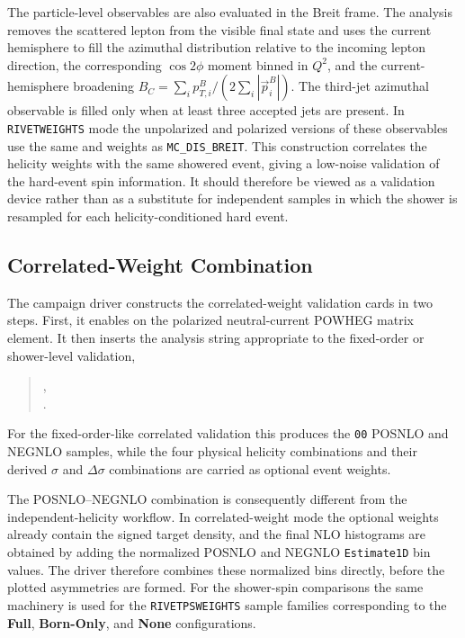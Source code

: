 \documentclass[a4paper,11pt]{article}
\begin{document}
The particle-level observables are also evaluated in the Breit frame. The
analysis removes the scattered lepton from the visible final state and uses the
current hemisphere to fill the azimuthal distribution relative to the incoming
lepton direction, the corresponding $\cos 2\phi$ moment binned in $Q^2$, and
the current-hemisphere broadening
$B_C=\sum_i p_{T,i}^B/(2\sum_i |\vec{p}_i^B|)$. The third-jet azimuthal
observable is filled only when at least three accepted jets are present. In
\texttt{RIVETWEIGHTS} mode the unpolarized and polarized versions of these
observables use the same  and
 weights as \texttt{MC\_DIS\_BREIT}. This construction
correlates the helicity weights with the same showered event, giving a low-noise
validation of the hard-event spin information. It should therefore be viewed as
a validation device rather than as a substitute for independent samples in which
the shower is resampled for each helicity-conditioned hard event.

\subsection{Correlated-Weight Combination}

The campaign driver constructs the correlated-weight validation cards in two
steps. First, it enables  on the polarized
neutral-current POWHEG matrix element. It then inserts the analysis string
appropriate to the fixed-order or shower-level validation,
\begin{quote}
\small
{},\\
.
\end{quote}
For the fixed-order-like correlated validation this produces the \texttt{00}
POSNLO and NEGNLO samples, while the four physical helicity combinations and
their derived $\sigma$ and $\Delta\sigma$ combinations are carried as optional
event weights.

The POSNLO--NEGNLO combination is consequently different from the
independent-helicity workflow. In correlated-weight mode the optional weights
already contain the signed target density, and the final NLO histograms are
obtained by adding the normalized POSNLO and NEGNLO \texttt{Estimate1D} bin
values. The driver therefore combines these normalized bins directly, before the
plotted asymmetries are formed. For the shower-spin comparisons the same
machinery is used for the \texttt{RIVETPSWEIGHTS} sample families corresponding
to the \textbf{Full}, \textbf{Born-Only}, and \textbf{None} configurations.
\end{document}
